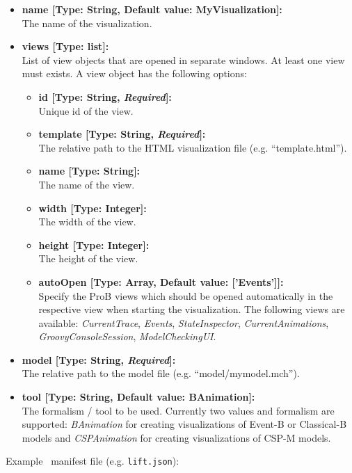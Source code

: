 \begin{itemize}
	\item[] \textbf{name [Type: String, Default value: MyVisualization]:}\\The name of the visualization. 
	\item[] \textbf{views [Type: list]:}\\ List of view objects that are opened in separate windows.
	At least one view must exists.
	A view object has the following options:
	\begin{itemize}
		\item[] \textbf{id [Type: String, \textit{Required}]:}\\ Unique id of the view.
		\item[] \textbf{template [Type: String, \textit{Required}]:}\\ The relative path to the HTML visualization file (e.g. ``template.html'').
		\item[] \textbf{name [Type: String]:}\\ The name of the view.
		\item[] \textbf{width [Type: Integer]:}\\ The width of the view.
		\item[] \textbf{height [Type: Integer]:}\\ The height of the view.
		\item[] \textbf{autoOpen [Type: Array, Default value: ['Events']]:}\\Specify the ProB views which should be opened automatically in the respective view when starting the visualization. 
The following views are available: \textit{CurrentTrace}, \textit{Events}, \textit{StateInspector}, \textit{CurrentAnimations}, \textit{GroovyConsoleSession}, \textit{ModelCheckingUI}.
	\end{itemize}
	\item[] \textbf{model [Type: String, \textit{Required}]:}\\The relative path to the model file (e.g. ``model/mymodel.mch'').
	\item[] \textbf{tool [Type: String, Default value: BAnimation]:}\\The formalism / tool to be used. Currently two values and formalism are supported: \textit{BAnimation} for creating visualizations of Event-B or Classical-B models and \textit{CSPAnimation} for creating visualizations of CSP-M models.
\end{itemize}

Example \bms\ manifest file (e.g. \texttt{lift.json}):

